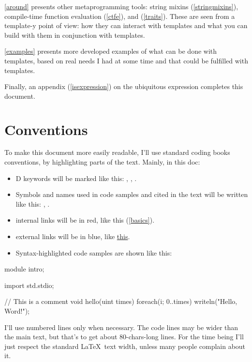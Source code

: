 \autoref{around} presents other meta\-pro\-gram\-ming tools: string mixins (\ref{stringmixins}), compile-time function evaluation (\ref{ctfe}), and  (\ref{traits}). These are seen from a \mbox{template-y} point of view: how they can interact with templates and what you can build with them in conjunction with templates.

\autoref{examples} presents more developed examples of what can be done with templates, based on real needs I had at some time and that could be fulfilled with templates.

Finally, an appendix (\autoref{isexpression}) on the ubiquitous  expression  completes this document.

\section*{Conventions}\label{conventions}

To make this document more easily readable, I'll use standard coding books conventions, by highlighting parts of the text. Mainly, in this doc:

\begin{itemize}
\item D keywords will be marked like this: , , .
\item Symbols and names used in code samples and cited in the text will be written like this: , .
\item internal links will be in red, like this (\ref{basics}).
\item external links will be in blue, like \href{http://www.dlang.org}{this}.
\item Syntax-highlighted code samples are shown like this:
\end{itemize}

\begin{ndcode}
module intro;

import std.stdio;

// This is a comment
void hello(uint times)
{
    foreach(i; 0..times) writeln("Hello, Word!");
}
\end{ndcode}

I'll use numbered lines only when necessary. The code lines may be wider than the main text, but that's to get about 80-chars-long lines. For the time being I'll just respect the standard \LaTeX\ text width, unless many people complain about it.

